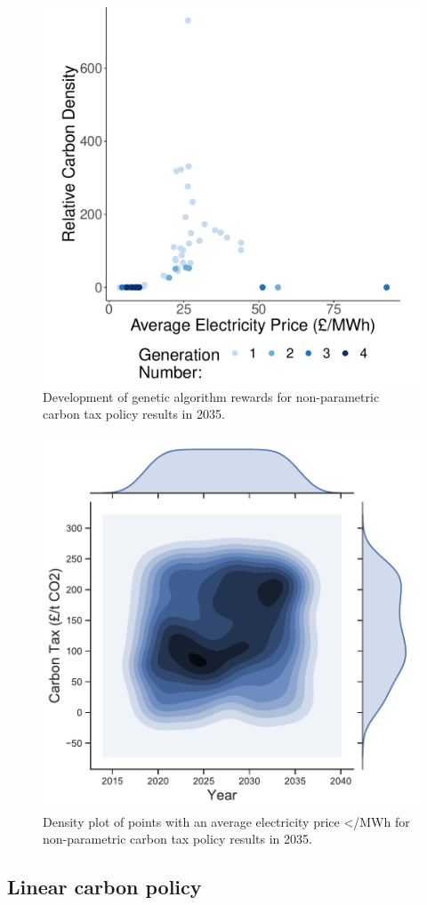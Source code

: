\begin{figure}
	\centering
	\includegraphics[width=0.6\linewidth]{Chapter6/figures/results/free_points_ga_development}
	\caption{Development of genetic algorithm rewards for non-parametric carbon tax policy results in 2035.}
	\label{fig:free_points_ga_development}
\end{figure}

\begin{figure}
	\centering
	\includegraphics[width=0.6\linewidth]{Chapter6/figures/results/best_heatmap_no_marginals}
	\caption{Density plot of points with an average electricity price </MWh for non-parametric carbon tax policy results in 2035.}
	\label{fig:heatmap_of_free_points}
\end{figure}



\subsection{Linear carbon policy}
\label{sssec:result_linear_carbon_strategy}

